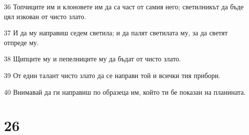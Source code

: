 \par 36 Топчиците им и клоновете им да са част от самия него; светилникът да бъде цял изкован от чисто злато.
\par 37 И да му направиш седем светила; и да палят светилата му, за да светят отпреде му.
\par 38 Щипците му и пепелниците му да бъдат от чисто злато.
\par 39 От един талант чисто злато да се направи той и всички тия прибори.
\par 40 Внимавай да ги направиш по образеца им, който ти бе показан на планината.

\chapter{26}

